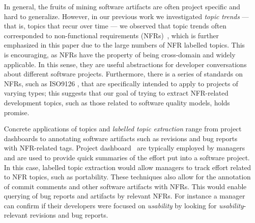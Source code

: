 \documentclass[smallextended]{svjour3}       %
\begin{document}



In general, the fruits of mining software artifacts are often project
specific and hard to generalize.  
However, in our previous work we
investigated \emph{topic trends} --- that is, topics that recur over
time --- we observed that topic trends often corresponded to
non-functional requirements (NFRs)~\cite{Hindle09ICSM}, which is
further emphasized in this paper due to the large numbers of NFR
labelled topics.  
This is encouraging, as NFRs have the property of being cross-domain
and widely applicable. 
In this sense, they are useful abstractions for developer
conversations about different software projects.  
Furthermore, there is a series of standards on NFRs, such as ISO9126 \cite{iso9126}, that are specifically intended to apply to projects of varying types; this suggests that our goal of trying to extract NFR-related development topics, such as those related to software quality models, holds promise.

Concrete applications of topics and \emph{labelled topic extraction}
range from project dashboards to annotating software artifacts such as revisions and bug reports with
NFR-related tags.
Project dashboard~\cite{dashboard} are typically employed by managers and are used to
provide quick summaries of the effort put into a software project. In this case, 
labelled topic extraction would allow managers to track effort
related to NFR topics, such as portability.
These techniques also allow for the annotation of commit comments
 and other software artifacts with NFRs. 
This would enable querying of bug reports and artifacts by relevant NFRs. 
For instance a manager can confirm if their developers were
focused on \emph{usability} by looking for
 \emph{usability}-relevant revisions and bug reports.
\end{document}

